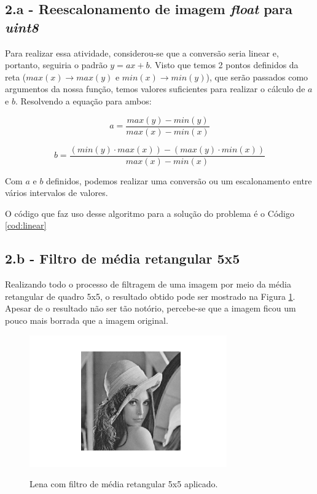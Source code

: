 \documentclass{article}
\begin{document}
\subsection*{2.a - Reescalonamento de imagem \textit{float} para \textit{uint8}}

Para realizar essa atividade, considerou-se que a conversão seria linear e, portanto, seguiria o padrão $y = ax + b$. Visto que temos 2 pontos definidos da reta ($max(x) \rightarrow max(y)$ e $min(x) \rightarrow min(y)$), que serão passados como argumentos da nossa função, temos valores suficientes para realizar o cálculo de $a$ e $b$. Resolvendo a equação para ambos:

\begin{equation}
	a = \frac{max(y) - min(y)}{max(x) - min(x)}
\end{equation}

\begin{equation}
	b = \frac{(min(y) \cdot max(x)) - (max(y) \cdot min(x))}{max(x) - min(x)}
\end{equation}

Com $a$ e $b$ definidos, podemos realizar uma conversão ou um escalonamento entre vários intervalos de valores.

O código que faz uso desse algoritmo para a solução do problema é o Código \ref{cod:linear}

\subsection*{2.b - Filtro de média retangular 5x5}
Realizando todo o processo de filtragem de uma imagem por meio da média retangular de quadro 5x5, o resultado obtido pode ser mostrado na Figura \ref{fig:rect_filter_lena}. Apesar de o resultado não ser tão notório, percebe-se que a imagem ficou um pouco mais borrada que a imagem original. 

\begin{figure}[H]
	\label{fig:rect_filter_lena}
	\begin{minipage}[b]{1.0\linewidth}
		\centering
		\centerline{\includegraphics[width=8.5cm]{Figures/lena_rect_filter}}
		\centerline{Lena com filtro de média retangular 5x5 aplicado.}\medskip
	\end{minipage}
\end{figure}
\end{document}
